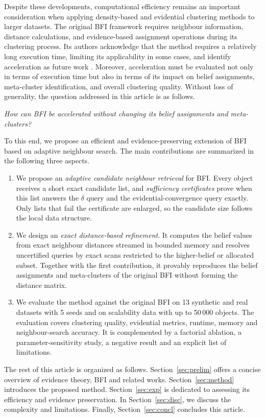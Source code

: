 \documentclass[journal]{IEEEtran}
\begin{document}
Despite these developments, computational efficiency remains an important consideration when applying density-based and evidential clustering methods to larger datasets. The original BFI framework requires neighbour information, distance calculations, and evidence-based assignment operations during its clustering process. Its authors acknowledge that the method requires a relatively long execution time, limiting its applicability in some cases, and identify acceleration as future work \cite{zhang2025}. Moreover, acceleration must be evaluated not only in terms of execution time but also in terms of its impact on belief assignments, meta-cluster identification, and overall clustering quality. Without loss of generality, the question addressed in this article is as follows.

\emph{How can BFI be accelerated without changing its belief assignments and meta-clusters?}

To this end, we propose an efficient and evidence-preserving extension of BFI based on adaptive neighbour search. The main contributions are summarized in the following three aspects.
\begin{enumerate}
\item We propose an \emph{adaptive candidate neighbour retrieval} for BFI. Every object receives a short exact candidate list, and \emph{sufficiency certificates} prove when this list answers the $\delta$ query and the evidential-convergence query exactly. Only lists that fail the certificate are enlarged, so the candidate size follows the local data structure.
\item We design an \emph{exact distance-based refinement}. It computes the belief values from exact neighbour distances streamed in bounded memory and resolves uncertified queries by exact scans restricted to the higher-belief or allocated subset. Together with the first contribution, it provably reproduces the belief assignments and meta-clusters of the original BFI without forming the distance matrix.
\item We evaluate the method against the original BFI on 13 synthetic and real datasets with 5 seeds and on scalability data with up to 50\,000 objects. The evaluation covers clustering quality, evidential metrics, runtime, memory and neighbour-search accuracy. It is complemented by a factorial ablation, a parameter-sensitivity study, a negative result and an explicit list of limitations.
\end{enumerate}

The rest of this article is organized as follows. Section~\ref{sec:prelim} offers a concise overview of evidence theory, BFI and related works. Section~\ref{sec:method} introduces the proposed method. Section~\ref{sec:exp} is dedicated to assessing its efficiency and evidence preservation. In Section~\ref{sec:disc}, we discuss the complexity and limitations. Finally, Section~\ref{sec:concl} concludes this article.
\end{document}
